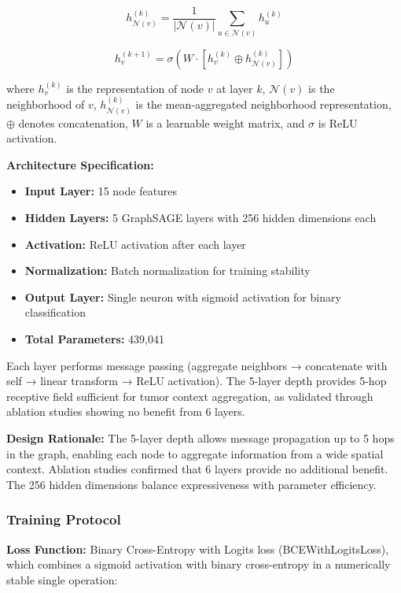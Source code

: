 \begin{equation}
h_{\mathcal{N}(v)}^{(k)} = \frac{1}{|\mathcal{N}(v)|} \sum_{u \in \mathcal{N}(v)} h_u^{(k)}
\end{equation}

\begin{equation}
h_v^{(k+1)} = \sigma \left( W \cdot \left[ h_v^{(k)} \oplus h_{\mathcal{N}(v)}^{(k)} \right] \right)
\end{equation}

where $h_v^{(k)}$ is the representation of node $v$ at layer $k$, $\mathcal{N}(v)$ is the neighborhood of $v$, $h_{\mathcal{N}(v)}^{(k)}$ is the mean-aggregated neighborhood representation, $\oplus$ denotes concatenation, $W$ is a learnable weight matrix, and $\sigma$ is ReLU activation.

\textbf{Architecture Specification:}
\begin{itemize}
    \item \textbf{Input Layer:} 15 node features
    \item \textbf{Hidden Layers:} 5 GraphSAGE layers with 256 hidden dimensions each
    \item \textbf{Activation:} ReLU activation after each layer
    \item \textbf{Normalization:} Batch normalization for training stability
    \item \textbf{Output Layer:} Single neuron with sigmoid activation for binary classification
    \item \textbf{Total Parameters:} 439,041
\end{itemize}


Each layer performs message passing (aggregate neighbors → concatenate with self → linear transform → ReLU activation). The 5-layer depth provides 5-hop receptive field sufficient for tumor context aggregation, as validated through ablation studies showing no benefit from 6 layers.

\textbf{Design Rationale:} The 5-layer depth allows message propagation up to 5 hops in the graph, enabling each node to aggregate information from a wide spatial context. Ablation studies confirmed that 6 layers provide no additional benefit. The 256 hidden dimensions balance expressiveness with parameter efficiency.

\subsubsection{Training Protocol}

\textbf{Loss Function:} Binary Cross-Entropy with Logits loss (BCEWithLogitsLoss), which combines a sigmoid activation with binary cross-entropy in a numerically stable single operation:


